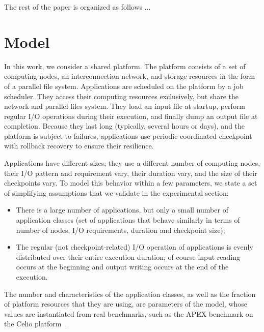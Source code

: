 \documentclass[conference]{IEEEtran}
\begin{document}
The rest of the paper is organized as follows ...

\section{Model}
\label{sec:model}


In this work, we consider a shared platform. The platform consists of
a set of computing nodes, an interconnection network, and storage
resources in the form of a parallel file system. Applications are
scheduled on the platform by a job scheduler. They access their
computing resources exclusively, but share the network and parallel
files system. They load an input file at startup, perform regular I/O operations during their
execution, and finally dump an output file at
completion. Because they last long (typically, several hours or days), and the platform is
subject to failures, applications use periodic coordinated checkpoint with
rollback recovery to ensure their resilience.

Applications have different sizes; they use a different number of
computing nodes, their I/O pattern and requirement vary, their
duration vary, and the size of their checkpoints vary. To model this
behavior within a few parameters, we state a set of simplifying assumptions
that we validate in the experimental section:
\begin{itemize}
  \item There is a large number of applications, but only a small number of
    application classes (set of applications that behave similarly in
    terms of number of nodes, I/O requirements, duration and
    checkpoint size);
  \item The regular (not checkpoint-related) I/O operation of applications is evenly distributed
    over their entire execution duration; of course input reading occurs at the beginning
    and output writing occurs at the end of the execution.
\end{itemize}

The number and characteristics of the application classes, as well as 
the fraction of platform resources that they are using, 
are parameters of the model, whose values are instantiated from real benchmarks, such as the APEX
benchmark on the Celio platform~\cite{xx}.
 
\end{document}
